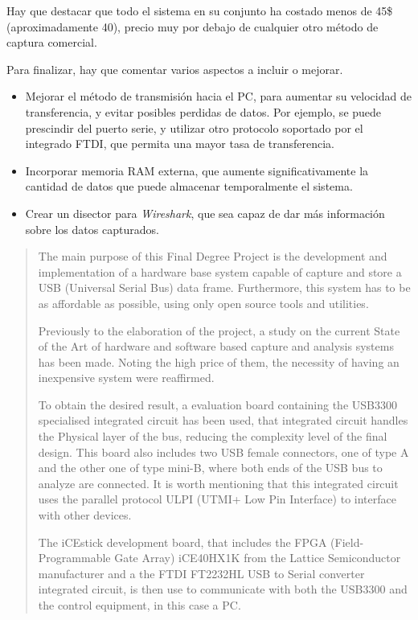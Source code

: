 \begin{resumen}
Hay que destacar que todo el sistema en su conjunto ha costado menos de 45\$ (aproximadamente 40\texteuro), precio muy por debajo de cualquier otro método de captura comercial.

Para finalizar, hay que comentar varios aspectos a incluir o mejorar.
\begin{itemize}
    \item Mejorar el método de transmisión hacia el PC, para aumentar su velocidad de transferencia, y evitar posibles perdidas de datos. Por ejemplo, se puede prescindir del puerto serie, y utilizar otro protocolo soportado por el integrado FTDI, que permita una mayor tasa de transferencia.
    \item Incorporar memoria RAM externa, que aumente significativamente la cantidad de datos que puede almacenar temporalmente el sistema.
    \item Crear un disector para \emph{Wireshark}, que sea capaz de dar más información sobre los datos capturados.
\end{itemize}

\end{resumen}


\begin{abstract}
The main purpose of this Final Degree Project is the development and implementation of a hardware base system capable of capture and store a USB (Universal Serial Bus) data frame. Furthermore, this system has to be as affordable as possible, using only open source tools and utilities.

Previously to the elaboration of the project, a study on the current State of the Art of hardware and software based capture and analysis systems has been made. Noting the high price of them, the necessity of having an inexpensive system were reaffirmed.

To obtain the desired result, a evaluation board containing the USB3300 specialised integrated circuit has been used, that integrated circuit handles the Physical layer of the bus, reducing the complexity level of the final design. This board also includes two USB female connectors, one of type A and the other one of type mini-B, where both ends of the USB bus to analyze are connected. It is worth mentioning that this integrated circuit uses the parallel protocol ULPI (UTMI+ Low Pin Interface) to interface with other devices.

The iCEstick development board, that includes the FPGA (Field-Programmable Gate Array) iCE40HX1K from the Lattice Semiconductor manufacturer and a the FTDI FT2232HL USB to Serial converter integrated circuit, is then use to communicate with both the USB3300 and the control equipment, in this case a PC.


\noWord[Terminar!!]
\end{abstract}
